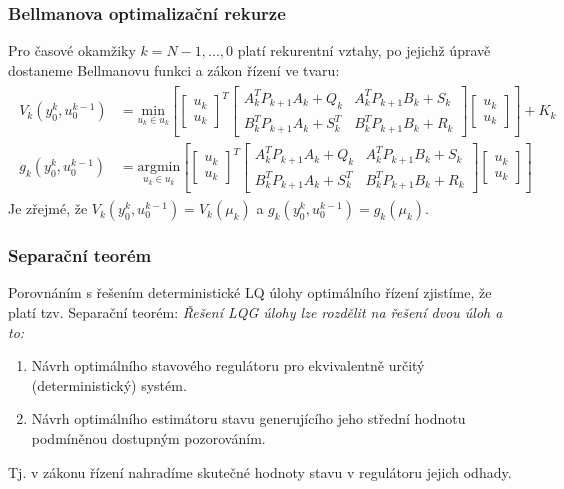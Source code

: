 \subsubsection*{Bellmanova optimalizační rekurze}
Pro časové okamžiky $ k=N-1,...,0 $ platí rekurentní vztahy, po jejichž úpravě dostaneme Bellmanovu funkci a zákon řízení ve tvaru:
\begin{align*}
\begin{split}
V_k(y_0^k, u_0^{k-1}) &= \underset{u_k \in u_k}{\mathrm{min}} \left[ \begin{bmatrix} u_k \\ u_k \end{bmatrix}^T \begin{bmatrix} A_k^T P_{k+1} A_k + Q_k & A_k^T P_{k+1} B_k + S_k \\ B_k^T P_{k+1} A_k + S_k^T & B_k^T P_{k+1} B_k + R_k \end{bmatrix} \begin{bmatrix} u_k \\ u_k \end{bmatrix} \right] + K_k \\
g_k(y_0^k, u_0^{k-1}) &= \underset{u_k \in u_k}{\mathrm{argmin}} \left[ \begin{bmatrix} u_k \\ u_k \end{bmatrix}^T \begin{bmatrix} A_k^T P_{k+1} A_k + Q_k & A_k^T P_{k+1} B_k + S_k \\ B_k^T P_{k+1} A_k + S_k^T & B_k^T P_{k+1} B_k + R_k \end{bmatrix} \begin{bmatrix} u_k \\ u_k \end{bmatrix} \right]
\end{split}
\end{align*}
Je zřejmé, že $ V_k(y_0^k, u_0^{k-1}) = V_k(\mu_k) $ a $ g_k(y_0^k, u_0^{k-1}) = g_k(\mu_k) $.

\subsubsection*{Separační teorém}
Porovnáním s řešením deterministické LQ úlohy optimálního řízení zjistíme, že platí tzv. Separační teorém: \textit{Řešení LQG úlohy lze rozdělit na řešení dvou úloh a to:}
\begin{enumerate}
\item Návrh optimálního stavového regulátoru pro ekvivalentně určitý (deterministický) systém.
\item Návrh optimálního estimátoru stavu generujícího jeho střední hodnotu podmíněnou dostupným pozorováním.
\end{enumerate}
Tj. v zákonu řízení nahradíme skutečné hodnoty stavu v regulátoru jejich odhady.


